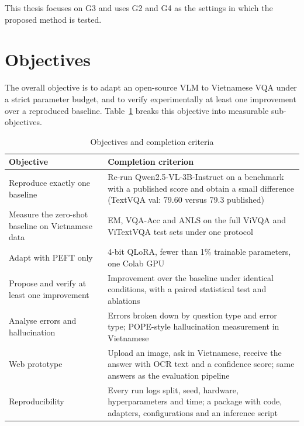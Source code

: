 This thesis focuses on G3 and uses G2 and G4 as the settings in which the
proposed method is tested.

\section{Objectives}
\label{sec:intro-objectives}

The overall objective is to adapt an open-source VLM to Vietnamese VQA under a
strict parameter budget, and to verify experimentally at least one improvement
over a reproduced baseline. Table~\ref{tab:objectives} breaks this objective
into measurable sub-objectives.

\begin{table}[htbp]
\caption{Objectives and completion criteria}
\label{tab:objectives}
\centering
\small
\begin{tabular}{p{}p{}}
\toprule
\textbf{Objective} & \textbf{Completion criterion} \\
\midrule
Reproduce exactly one baseline &
Re-run Qwen2.5-VL-3B-Instruct on a benchmark with a published score and obtain a
small difference (TextVQA val: 79.60 versus 79.3 published) \\
Measure the zero-shot baseline on Vietnamese data &
EM, VQA-Acc and ANLS on the full ViVQA and ViTextVQA test sets under one
protocol \\
Adapt with PEFT only &
4-bit QLoRA, fewer than 1\% trainable parameters, one Colab GPU \\
Propose and verify at least one improvement &
Improvement over the baseline under identical conditions, with a paired
statistical test and ablations \\
Analyse errors and hallucination &
Errors broken down by question type and error type; POPE-style hallucination
measurement in Vietnamese \\
Web prototype &
Upload an image, ask in Vietnamese, receive the answer with OCR text and a
confidence score; same answers as the evaluation pipeline \\
Reproducibility &
Every run logs split, seed, hardware, hyperparameters and time; a package with
code, adapters, configurations and an inference script \\
\bottomrule
\end{tabular}
\end{table}

